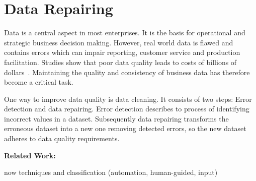 
\section{Data Repairing}\label{sec:introduction}
  Data is a central aspect in most enterprises.
  It is the basis for operational and strategic business decision making.
  However, real world data is flawed and contains errors which can impair reporting, customer service and production facilitation.
  Studies show that poor data quality leads to costs of billions of dollars~\cite{Redman:quality_disaster, cost_of_low_qual}.
  Maintaining the quality and consistency of business data has therefore become a critical task.

  One way to improve data quality is data cleaning.
  It consists of two steps: Error detection and data repairing.
  Error detection describes to process of identifying incorrect values in a dataset.
  Subsequently data repairing transforms the erroneous dataset into a new one removing detected errors, so the new dataset adheres to data quality requirements.
  
  \textbf{Related Work:}
  
  now techniques and classification (automation, human-guided, input)
  
